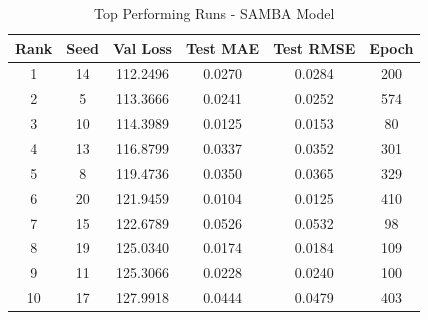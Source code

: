 \begin{table}[ht]
\centering
\caption{Top Performing Runs - SAMBA Model}
\label{tab:samba_results}
\begin{tabular}{cccccc}
\hline
\textbf{Rank} & \textbf{Seed} & \textbf{Val Loss} & \textbf{Test MAE} & \textbf{Test RMSE} & \textbf{Epoch} \\
\hline
1 & 14 & 112.2496 & 0.0270 & 0.0284 & 200 \\
2 & 5 & 113.3666 & 0.0241 & 0.0252 & 574 \\
3 & 10 & 114.3989 & 0.0125 & 0.0153 & 80 \\
4 & 13 & 116.8799 & 0.0337 & 0.0352 & 301 \\
5 & 8 & 119.4736 & 0.0350 & 0.0365 & 329 \\
6 & 20 & 121.9459 & 0.0104 & 0.0125 & 410 \\
7 & 15 & 122.6789 & 0.0526 & 0.0532 & 98 \\
8 & 19 & 125.0340 & 0.0174 & 0.0184 & 109 \\
9 & 11 & 125.3066 & 0.0228 & 0.0240 & 100 \\
10 & 17 & 127.9918 & 0.0444 & 0.0479 & 403 \\
\hline
\end{tabular}
\end{table}
